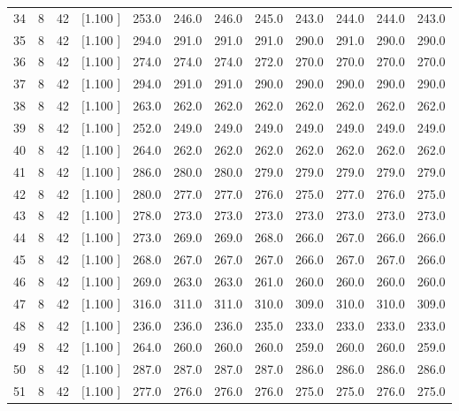 \documentclass[12pt,a4paper]{article}
\begin{document}
\begin{center}
{\begin{tabular}{r r r r r r r r r r r r}
  34&  8& 42&[1.100     ]&   253.0&   246.0&   246.0&   245.0&   243.0&   244.0&   244.0&   243.0\\[-0.02in]
  35&  8& 42&[1.100     ]&   294.0&   291.0&   291.0&   291.0&   290.0&   291.0&   290.0&   290.0\\[-0.02in]
  36&  8& 42&[1.100     ]&   274.0&   274.0&   274.0&   272.0&   270.0&   270.0&   270.0&   270.0\\[-0.02in]
  37&  8& 42&[1.100     ]&   294.0&   291.0&   291.0&   290.0&   290.0&   290.0&   290.0&   290.0\\[-0.02in]
  38&  8& 42&[1.100     ]&   263.0&   262.0&   262.0&   262.0&   262.0&   262.0&   262.0&   262.0\\[-0.02in]
  39&  8& 42&[1.100     ]&   252.0&   249.0&   249.0&   249.0&   249.0&   249.0&   249.0&   249.0\\[-0.02in]
  40&  8& 42&[1.100     ]&   264.0&   262.0&   262.0&   262.0&   262.0&   262.0&   262.0&   262.0\\[-0.02in]
  41&  8& 42&[1.100     ]&   286.0&   280.0&   280.0&   279.0&   279.0&   279.0&   279.0&   279.0\\[-0.02in]
  42&  8& 42&[1.100     ]&   280.0&   277.0&   277.0&   276.0&   275.0&   277.0&   276.0&   275.0\\[-0.02in]
  43&  8& 42&[1.100     ]&   278.0&   273.0&   273.0&   273.0&   273.0&   273.0&   273.0&   273.0\\[-0.02in]
  44&  8& 42&[1.100     ]&   273.0&   269.0&   269.0&   268.0&   266.0&   267.0&   266.0&   266.0\\[-0.02in]
  45&  8& 42&[1.100     ]&   268.0&   267.0&   267.0&   267.0&   266.0&   267.0&   267.0&   266.0\\[-0.02in]
  46&  8& 42&[1.100     ]&   269.0&   263.0&   263.0&   261.0&   260.0&   260.0&   260.0&   260.0\\[-0.02in]
  47&  8& 42&[1.100     ]&   316.0&   311.0&   311.0&   310.0&   309.0&   310.0&   310.0&   309.0\\[-0.02in]
  48&  8& 42&[1.100     ]&   236.0&   236.0&   236.0&   235.0&   233.0&   233.0&   233.0&   233.0\\[-0.02in]
  49&  8& 42&[1.100     ]&   264.0&   260.0&   260.0&   260.0&   259.0&   260.0&   260.0&   259.0\\[-0.02in]
  50&  8& 42&[1.100     ]&   287.0&   287.0&   287.0&   287.0&   286.0&   286.0&   286.0&   286.0\\[-0.02in]
  51&  8& 42&[1.100     ]&   277.0&   276.0&   276.0&   276.0&   275.0&   275.0&   276.0&   275.0\\[-0.02in]

\end{tabular}}
\end{center}
\end{document}
